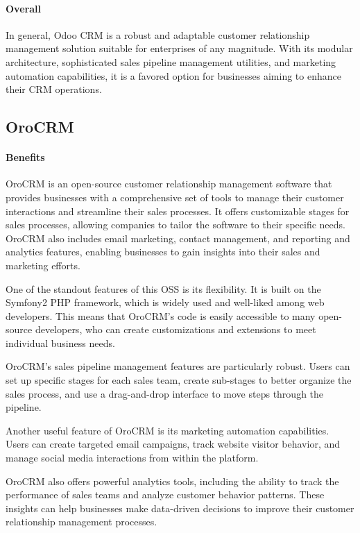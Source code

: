 \documentclass{article}
\begin{document}
\paragraph{Overall}

In general, Odoo CRM is a robust and adaptable customer relationship management solution suitable for enterprises of any magnitude. With its modular architecture, sophisticated sales pipeline management utilities, and marketing automation capabilities, it is a favored option for businesses aiming to enhance their CRM operations.

\subsection{OroCRM}

\paragraph{Benefits}

OroCRM is an open-source customer relationship management software that provides businesses with a comprehensive set of tools to manage their customer interactions and streamline their sales processes. It offers customizable stages for sales processes, allowing companies to tailor the software to their specific needs. OroCRM also includes email marketing, contact management, and reporting and analytics features, enabling businesses to gain insights into their sales and marketing efforts.

One of the standout features of this OSS is its flexibility. It is built on the Symfony2 PHP framework, which is widely used and well-liked among web developers. This means that OroCRM's code is easily accessible to many open-source developers, who can create customizations and extensions to meet individual business needs.

OroCRM's sales pipeline management features are particularly robust. Users can set up specific stages for each sales team, create sub-stages to better organize the sales process, and use a drag-and-drop interface to move steps through the pipeline.

Another useful feature of OroCRM is its marketing automation capabilities. Users can create targeted email campaigns, track website visitor behavior, and manage social media interactions from within the platform.

OroCRM also offers powerful analytics tools, including the ability to track the performance of sales teams and analyze customer behavior patterns. These insights can help businesses make data-driven decisions to improve their customer relationship management processes.
\end{document}
